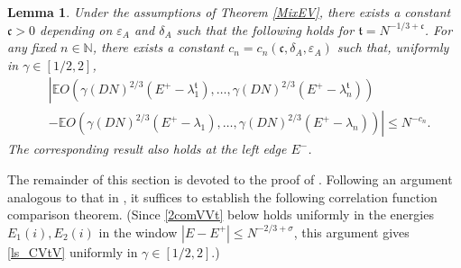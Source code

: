 \documentclass[10pt,reqno]{amsart}
\numberwithin{equation}{section}
\numberwithin{figure}{section}
\theoremstyle{plain} %
\newtheorem{lemma}[theorem]{Lemma}
\theoremstyle{definition} %
\newcommand{\E}{\mathbb{E}}
\newcommand{\N}{\mathbb{N}}
\newcommand{\fc}{\mathfrak c}
\newcommand{\ft}{{\mathfrak t}}
\renewcommand{\leq}{\le}
\newcommand{\pa}[1]{\left({#1}\right)}
\newcommand{\e}{{\varepsilon}}
\numberwithin{equation}{section}
\begin{document}
\begin{lemma}\label{CVtV} 
Under the assumptions of Theorem \ref{MixEV}, there exists a constant $\fc>0$ depending on $\e_A$ and $\delta_A$ such that the following holds for $\ft= N^{-1/3+\fc}$.  
For any fixed $n\in \N$, there exists a constant $c_n=c_n(\fc,\delta_A,\e_A)$ such that, uniformly in $\gamma\in[1/2,2]$,
\begin{align}
&\left|	\E O\pa{ \gamma\pa{DN}^{2/3}\pa{E^+-\lambda_1^{\ft}},\ldots, \gamma\pa{DN}^{2/3}\pa{E^+-\lambda_n^{\ft}}}\right.\nonumber\\
&\left.-\E O\pa{ \gamma\pa{DN}^{2/3}\pa{E^+-\lambda_1},\ldots, \gamma\pa{DN}^{2/3}\pa{E^+-\lambda_n}}   \right|\leq N^{-c_n}.\label{ls_CVtV}
\end{align}
The corresponding result also holds at the left edge $E^-$.
\end{lemma}


The remainder of this section is devoted to the proof of . Following an argument analogous to that in \cite[Section 17]{Erds2017ADA}, it suffices to establish the following correlation function comparison theorem. (Since \eqref{2comVVt} below holds uniformly in the energies $E_1(i),E_2(i)$ in the window $|E-E^+|\le N^{-2/3+\sigma}$, this argument gives \eqref{ls_CVtV} uniformly in $\gamma\in[1/2,2]$.)
\end{document}
